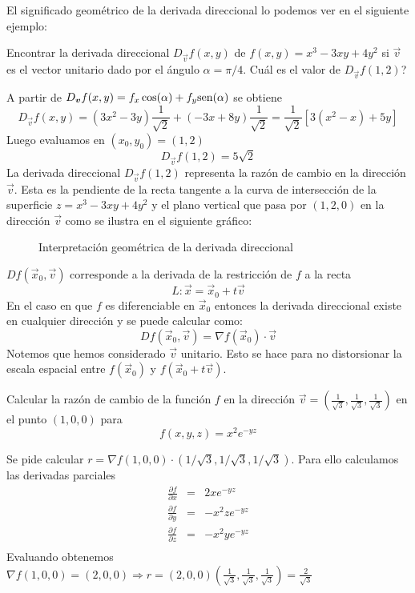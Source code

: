 El significado geom\'etrico de la derivada direccional lo podemos ver en el siguiente ejemplo:
\begin{ejemplo}
Encontrar la derivada direccional $D_{\vec{v}} f(x,y)$ de $f(x,y)=x^3-3xy+4y^2$ si $\vec{v}$ es el vector unitario dado por el \'angulo $\alpha=\pi/4$. {\textquestiondown}Cu\'al es el valor de $D_{\vec{v}} f(1,2)$?

\begin{solucion}
A partir de $D_{\boldsymbol{v}} f(x,y) = f_x \cos(\alpha) + f_y \text{sen}(\alpha)$ se obtiene
$$
D_{\vec{v}} f(x,y) = (3x^2 - 3y)\frac{1}{\sqrt{2}} + (-3x+8y)\frac{1}{\sqrt{2}}=\frac{1}{\sqrt{2}}[3(x^2-x)+5y]
$$
Luego evaluamos en $(x_0,y_0)=(1,2)$
$$
D_{\vec{v}} f(1,2) = 5\sqrt{2} 
$$
La derivada direccional $D_{\vec{v}} f(1,2)$ representa la raz\'on de cambio en la direcci\'on $\vec{v}$. Esta es la pendiente de la recta tangente a la curva de intersecci\'on de la superficie $z=x^3-3xy+4y^2$ y el plano vertical que pasa por $(1,2,0)$ en la direcci\'on $\vec{v}$ como se ilustra en el siguiente gr\'afico:
\begin{figure}[H]
	\centering
	
	\caption{Interpretaci\'on geom\'etrica de la derivada direccional}
\end{figure}
\end{solucion}
\end{ejemplo}

$Df(\vec{x}_0,\vec{v}) $ corresponde a la derivada de la restricci\'on de $ f $
a la recta
\[ L: \vec{x}=\vec{x}_0+t\vec{v}\]
En el caso en que $ f $ es diferenciable en $ \vec{x}_0 $ entonces la
derivada direccional existe en cualquier direcci\'on y se puede
calcular como:
\[ Df(\vec{x}_0,\vec{v})=\nabla f(\vec{x}_0)\cdot \vec{v} \]
Notemos que hemos considerado $\vec{v}$ unitario. Esto se hace para no
distorsionar la escala espacial entre $ f(\vec{x}_0) $ y $ f(\vec{x}_0+t\vec{v})$.

\begin{ejemplo}
Calcular la raz\'on de cambio de la funci\'on $ f $ en la direcci\'on $
\vec{v}=(\frac{1}{\sqrt{3}},\frac{1}{\sqrt{3}},\frac{1}{\sqrt{3}})$ en el punto $(1,0,0) $
 para \[ f(x,y,z)=x^2e^{-yz}\]
\begin{solucion}
Se pide  calcular $r= \nabla f(1,0,0)\cdot
(1/\sqrt{3},1/\sqrt{3},1/\sqrt{3}).$ Para ello calculamos las derivadas
parciales
\begin{eqnarray*}
\frac{\partial f}{\partial x}&=&  2xe^{-yz} \\
\frac{\partial f}{\partial y}&=& -x^2ze^{-yz} \\
\frac{\partial f}{\partial z}&=& -x^2ye^{-yz} \\
\end{eqnarray*}
Evaluando obtenemos $ \nabla f(1,0,0)=(2,0,0) \Rightarrow r=(2,0,0)(\frac{1}{\sqrt{3}},\frac{1}{\sqrt{3}},\frac{1}{\sqrt{3}})=\frac{2}{\sqrt{3}}$
\end{solucion}
\end{ejemplo}

